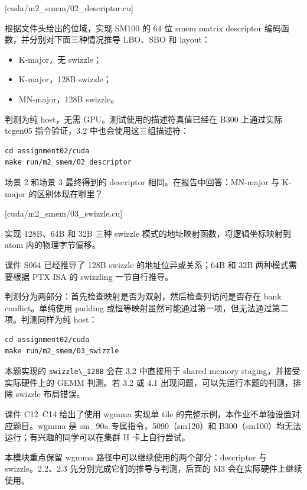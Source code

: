 \documentclass[11pt,a4paper,fontset=none]{ctexart}
\providecommand{\tightlist}{\setlength{\itemsep}{0pt}\setlength{\parskip}{0pt}}
\providecommand{\passthrough}[1]{#1}
\begin{document}
[cuda/m2\_smem/02\_descriptor.cu]

根据文件头给出的位域，实现 SM100 的 64 位 smem matrix descriptor
编码函数，并分别对下面三种情况推导 LBO、SBO 和 layout：

\begin{itemize}
\tightlist
\item
  K-major，无 swizzle；
\item
  K-major，128B swizzle；
\item
  MN-major，128B swizzle。
\end{itemize}

判测为纯 host，无需 GPU。测试使用的描述符真值已经在 B300 上通过实际
tcgen05 指令验证，3.2 中也会使用这三组描述符：

\begin{lstlisting}
cd assignment02/cuda
make run/m2_smem/02_descriptor
\end{lstlisting}

场景 2 和场景 3 最终得到的 descriptor 相同。在报告中回答：MN-major 与
K-major 的区别体现在哪里？

[cuda/m2\_smem/03\_swizzle.cu]

实现 128B、64B 和 32B 三种 swizzle 模式的地址映射函数，将逻辑坐标映射到
atom 内的物理字节偏移。

课件 S064 已经推导了 128B swizzle 的地址位异或关系；64B 和 32B
两种模式需要根据 PTX ISA 的 swizzling 一节自行推导。

判测分为两部分：首先检查映射是否为双射，然后检查列访问是否存在 bank
conflict。单纯使用 padding
或恒等映射虽然可能通过第一项，但无法通过第二项。判测同样为纯 host：

\begin{lstlisting}
cd assignment02/cuda
make run/m2_smem/03_swizzle
\end{lstlisting}

本题实现的 \passthrough{\lstinline!swizzle\_128B!} 会在 3.2 中直接用于
shared memory staging，并接受实际硬件上的 GEMM 判测。若 3.2 或 4.1
出现问题，可以先运行本题的判测，排除 swizzle 布局错误。

\begin{lookback}

课件 C12--C14 给出了使用 wgmma 实现单 tile
的完整示例，本作业不单独设置对应题目。wgmma 是 sm\_90a
专属指令，5090（sm120）和
B300（sm100）均无法运行；有兴趣的同学可以在集群 H 卡上自行尝试。

本模块重点保留 wgmma 路径中可以继续使用的两个部分：descriptor 与
swizzle。2.2、2.3 先分别完成它们的推导与判测，后面的 M3
会在实际硬件上继续使用。

\end{lookback}
\end{document}
